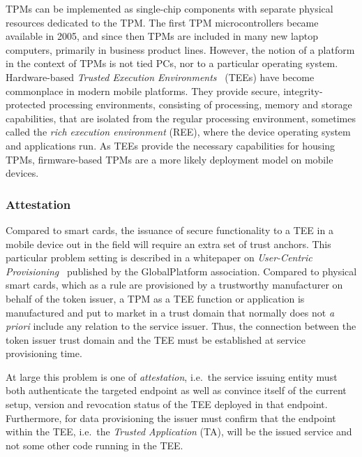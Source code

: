 \documentclass{sig-alternate-2013}
\begin{document}
TPMs can be implemented as single-chip components with separate physical
resources dedicated to the TPM\@. The first TPM microcontrollers became
available in 2005\footnotemark, and since then TPMs are included in many new
laptop computers, primarily in business product lines. However, the notion of a
platform in the context of TPMs is not tied PCs, nor to a particular operating
system. Hardware-based \emph{Trusted Execution Environments}~\cite{Ekberg14}
(TEEs) have become commonplace in modern mobile platforms. They provide secure,
integrity-protected processing environments, consisting of processing, memory
and storage capabilities, that are isolated from the regular processing
environment, sometimes called the \emph{rich execution environment} (REE), where
the device operating system and applications run. As TEEs provide the necessary
capabilities for housing TPMs, firmware-based TPMs are a more likely deployment
model on mobile devices.


\subsubsection{Attestation}
\label{sec:attestation}

Compared to smart cards, the issuance of secure functionality to a TEE in a
mobile device out in the field will require an extra set of trust anchors. This
particular problem setting is described in a whitepaper on \emph{User-Centric
Provisioning}~\cite{GlobalPlatform12} published by the GlobalPlatform
association\footnotemark. Compared to physical smart cards, which as a rule are
provisioned by a trustworthy manufacturer on behalf of the token issuer, a TPM
as a TEE function or application is manufactured and put to market in a trust
domain that normally does not \emph{a priori} include any relation to the
service issuer. Thus, the connection between the token issuer trust domain and
the TEE must be established at service provisioning time.


At large this problem is one of \textit{attestation}, i.e.\ the service issuing
entity must both authenticate the targeted endpoint as well as convince itself
of the current setup, version and revocation status of the TEE deployed in that
endpoint. Furthermore, for data provisioning the issuer must confirm that the
endpoint within the TEE, i.e.\ the \emph{Trusted Application} (TA), will be the
issued service and not some other code running in the TEE\@.
\end{document}
